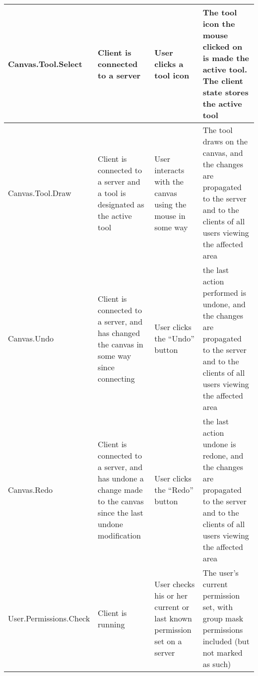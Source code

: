 \documentclass[11pt,oneside,a4paper]{article}
\begin{document}
\begin{center}
\begin{tabular}{ | l | p{3cm} | p{3cm} | p{3cm} | }
\tiny{Canvas.Tool.Select}		& \tiny{Client is connected to a server}																				& \tiny{User clicks a tool icon}																	& \tiny{The tool icon the mouse clicked on is made the active tool. The client state stores the active tool} \\\hline
\tiny{Canvas.Tool.Draw}			& \tiny{Client is connected to a server and a tool is designated as the active tool}									& \tiny{User interacts with the canvas using the mouse in some way}									& \tiny{The tool draws on the canvas, and the changes are propagated to the server and to the clients of all users viewing the affected area} \\\hline
\tiny{Canvas.Undo}				& \tiny{Client is connected to a server, and has changed the canvas in some way since connecting}						& \tiny{User clicks the ``Undo'' button}															& \tiny{the last action performed is undone, and the changes are propagated to the server and to the clients of all users viewing the affected area} \\\hline
\tiny{Canvas.Redo}				& \tiny{Client is connected to a server, and has undone a change made to the canvas since the last undone modification}	& \tiny{User clicks the ``Redo'' button}															& \tiny{the last action undone is redone, and the changes are propagated to the server and to the clients of all users viewing the affected area} \\\hline
\tiny{User.Permissions.Check}	& \tiny{Client is running}																								& \tiny{User checks his or her current or last known permission set on a server}					& \tiny{The user's current permission set, with group mask permissions included (but not marked as such)} \\\hline
\end{tabular}
\end{center}

\pagebreak
\end{document}
